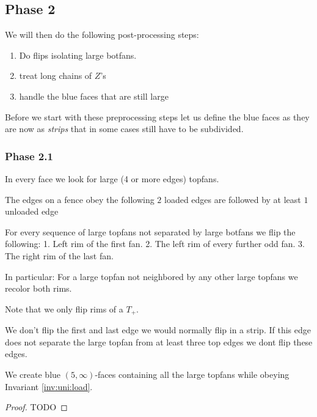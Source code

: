 \subsection{Phase 2}
  We will then do the following post-processing steps:

  \begin{enumerate}
    \item Do flips isolating large botfans.
    \item treat long chains of $Z$'s
    \item handle the blue faces that are still large
  \end{enumerate}

  Before we start with these preprocessing steps let us define the blue faces as they are now as \emph{strips} that in some cases still have to be subdivided.

  \subsubsection{Phase 2.1}
    In every face we look for large (4 or more edges) topfans.

    \begin{invariants}
      \label{inv:uni:load}
      \item The edges on a fence obey the following $2$ loaded edges are followed by at least $1$ unloaded edge
    \end{invariants}

    For every sequence of large topfans not separated by large botfans we flip the following:
    1. Left rim of the first fan.
    2. The left rim of every further odd fan.
    3. The right rim of the last fan.

    In particular: For a large topfan not neighbored by any other large topfans we recolor both rims.

    Note that we only flip rims of a $T_+$.

    We don't flip the first and last edge we would normally flip in a strip. If this edge does not separate the large topfan from at least three top edges we dont flip these edges.

    \begin{lemma}
      \label{lm:uni:removingLargeB-fans}
      We create blue $(5, \infty)$-faces containing all the large topfans while obeying Invariant \ref{inv:uni:load}.
    \end{lemma}
    \begin{proof}
      TODO 
    \end{proof}

